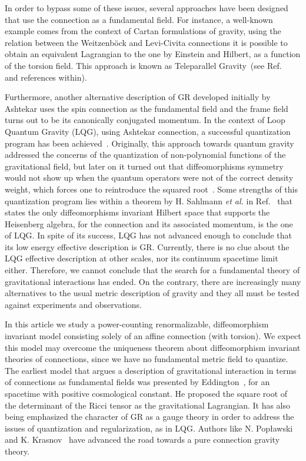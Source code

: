 \documentclass[twocolumn,aps,
  showpacs,showkeys,prd,superscriptaddress]{revtex4-1}
\renewcommand{\(}{\left(}
\renewcommand{\)}{\right)}
\renewcommand{\[}{\left[}
\renewcommand{\]}{\right]}
\begin{document}
In order to bypass some of these issues, several approaches have been designed that use the connection as a fundamental field. For instance, a well-known example comes from the context of Cartan formulations of gravity, using the relation between the Weitzenb\"ock and Levi-Civita connections it is possible to obtain an equivalent Lagrangian to the one by Einstein and Hilbert, as a function of the torsion field. This approach is known as Teleparallel Gravity~(see Ref.~\cite{Maluf:2013gaa,Teleparallel,Baez:2012bn} and references within).

Furthermore, another alternative description of GR developed initially by Ashtekar uses the spin connection as the fundamental field and the frame field turns out to be its canonically conjugated momentum. In the context of Loop Quantum Gravity (LQG), using Ashtekar connection, a successful quantization program has been achieved~\cite{Ashtekar:2004eh,thiemann2007loop}. Originally, this approach towards quantum gravity addressed the concerns of the quantization of non-polynomial functions of the gravitational field, but later on it turned out that diffeomorphisms symmetry would not show up when the quantum operators were not of the correct density weight, which forces one to reintroduce the squared root~\cite{Thiemann:1996aw}.  Some  strengths of this quantization program lies within a theorem by H. Sahlmann \emph{et al.} in Ref.~\cite{Lewandowski:2005jk} that states the only diffeomorphisms invariant Hilbert space that supports the Heisenberg algebra, for the connection and its associated momentum, is the one of LQG. In spite of its success, LQG has not advanced enough to conclude that its low energy effective description is GR. Currently, there is no clue about the LQG effective description at other scales,  nor its continuum spacetime limit either. Therefore, we cannot conclude that the search for a fundamental theory of gravitational interactions has ended. On the contrary, there are increasingly many alternatives to the usual metric description of gravity and they all must be tested against experiments and observations.

In this article we study a power-counting renormalizable,  diffeomorphism invariant model  consisting  solely of an affine connection  (with torsion). We expect  this model may  overcome  the uniqueness theorem about diffeomorphism invariant theories of connections, since we  have no fundamental metric field to quantize. The earliest model that argues  a description of gravitational interaction in terms of connections as fundamental fields  was presented by Eddington~\cite{Eddington1923math}, for an spacetime with positive cosmological constant. He proposed the square root of the determinant of the Ricci tensor as the gravitational Lagrangian.
It has also being emphasized the character of GR as a gauge theory in order to address the issues of quantization and regularization, as in LQG.   Authors like N. Pop{\l}awski~\cite{Poplawski:2012bw} and K. Krasnov~\cite{Krasnov:2011pp} have advanced the road towards a pure connection gravity theory.
\end{document}

